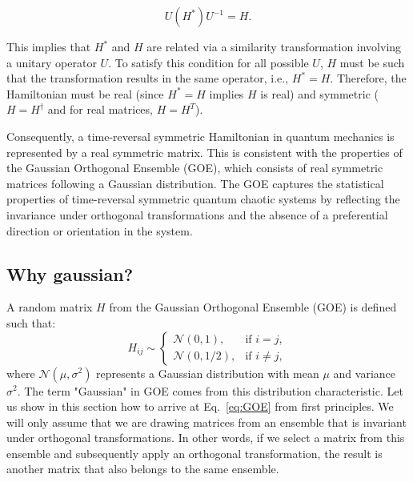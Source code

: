 \documentclass[10pt]{article}
\begin{document}
\[
U(H^*)U^{-1} = H.
\]

This implies that $H^*$ and $H$ are related via a similarity transformation involving 
a unitary operator $U$. To satisfy this condition for all possible $U$, $H$ must be 
such that the transformation results in the same operator, i.e., $H^* = H$. Therefore, 
the Hamiltonian must be real (since $H^* = H$ implies $H$ is real) and symmetric 
($H = H^\dagger$ and for real matrices, $H = H^T$).

Consequently, a time-reversal symmetric Hamiltonian in quantum mechanics is 
represented by a real symmetric matrix. This is consistent with the properties of 
the Gaussian Orthogonal Ensemble (GOE), which consists of real symmetric matrices 
following a Gaussian distribution. The GOE captures the statistical properties of 
time-reversal symmetric quantum chaotic systems by reflecting the invariance under 
orthogonal transformations and the absence of a preferential direction or orientation 
in the system.

\subsection{Why gaussian?}
A random matrix $H$ from the Gaussian Orthogonal Ensemble (GOE) is defined such that:
\begin{equation}\label{eq:GOE}
H_{ij} \sim 
  \begin{cases}
  \mathcal{N}(0, 1), & \text{if } i = j, \\
  \mathcal{N}(0, 1/2), & \text{if } i \ne j,
  \end{cases}
\end{equation}
where $\mathcal{N}(\mu, \sigma^2)$ represents a Gaussian distribution with mean 
$\mu$ and variance $\sigma^2$. The term "Gaussian" in GOE comes from this 
distribution characteristic. Let us show in  this section how to
arrive at Eq.~\eqref{eq:GOE} from first principles. We will only assume 
that we are drawing matrices from an ensemble that is invariant under 
orthogonal transformations. In other words, if we select a matrix 
from this ensemble and subsequently apply an orthogonal transformation, 
the result is another matrix that also belongs to the same ensemble.
\end{document}
